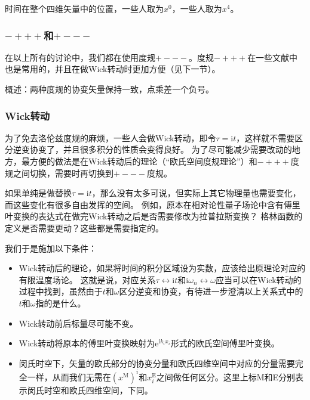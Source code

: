 \documentclass[hyperref, UTF8, a4paper]{ctexart}
\newcommand*{\ii}{\mathrm{i}}
\newcommand*{\ee}{\mathrm{e}}
\begin{document}
时间在整个四维矢量中的位置，一些人取为$x^0$，一些人取为$x^4$。

\subsubsection{$-+++$和$+---$}

在以上所有的讨论中，我们都在使用度规$+---$。度规$-+++$在一些文献中也是常用的，并且在做Wick转动时更加方便（见下一节）。

概述：两种度规的协变矢量保持一致，点乘差一个负号。

\subsubsection{Wick转动}

为了免去洛伦兹度规的麻烦，一些人会做Wick转动，即令$\tau=\ii t$，这样就不需要区分逆变协变了，并且很多积分的性质会变得良好。
为了尽可能减少需要改动的地方，最方便的做法是在Wick转动后的理论（“欧氏空间度规理论”）和$-+++$度规之间切换，需要时再切换到$+---$度规。

如果单纯是做替换$\tau = \ii t$，那么没有太多可说，但实际上其它物理量也需要变化，而这些变化有很多自由发挥的空间。
例如，原本在相对论性量子场论中含有傅里叶变换的表达式在做完Wick转动之后是否需要修改为拉普拉斯变换？
格林函数的定义是否需要更动？这些都是需要指定的。

我们于是施加以下条件：
\begin{itemize}
    \item Wick转动后的理论，如果将时间的积分区域设为实数，应该给出原理论对应的有限温度场论。
    这就是说，对应关系$\tau \leftrightarrow \ii t$和$\ii \omega_n \leftrightarrow \omega$应当可以在Wick转动的过程中找到，虽然由于$t$和$\omega$区分逆变和协变，有待进一步澄清以上关系式中的$t$和$\omega$指的是什么。
    \item Wick转动前后标量尽可能不变。
    \item Wick转动将原本的傅里叶变换映射为$\ee^{\ii k_i x_i}$形式的欧氏空间傅里叶变换。
    \item 闵氏时空下，矢量的欧氏部分的协变分量和欧氏四维空间中对应的分量需要完全一样，从而我们无需在$(x^\text{M})^i$和$x^\text{E}_i$之间做任何区分。这里上标M和E分别表示闵氏时空和欧氏四维空间，下同。
\end{itemize}
\end{document}
